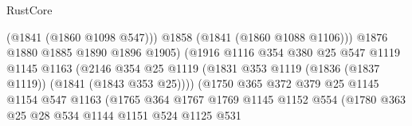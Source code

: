 \begin{lexlean}{RustCore}
\begin{coremodule}
                                            (@1841 (@1860 @1098 @547)))
                                          @1858
                                          (@1841 (@1860 @1088 @1106)))
                                        @1876
                                        @1880
                                        @1885
                                        @1890
                                        @1896
                                        @1905)
                                      (@1916
                                        @1116
                                        @354
                                        @380
                                        @25
                                        @547
                                        @1119
                                        @1145
                                        @1163
                                        (@2146
                                          @354
                                          @25
                                          @1119
                                          (@1831
                                            @353
                                            @1119
                                            (@1836 (@1837 @1119))
                                            (@1841 (@1843 @353 @25))))
                                        (@1750
                                          @365
                                          @372
                                          @379
                                          @25
                                          @1145
                                          @1154
                                          @547
                                          @1163
                                          (@1765
                                            @364
                                            @1767
                                            @1769
                                            @1145
                                            @1152
                                            @554
                                            (@1780
                                              @363
                                              @25
                                              @28
                                              @534
                                              @1144
                                              @1151
                                              @524
                                              @1125
                                              @531

\end{coremodule}
\end{lexlean}
